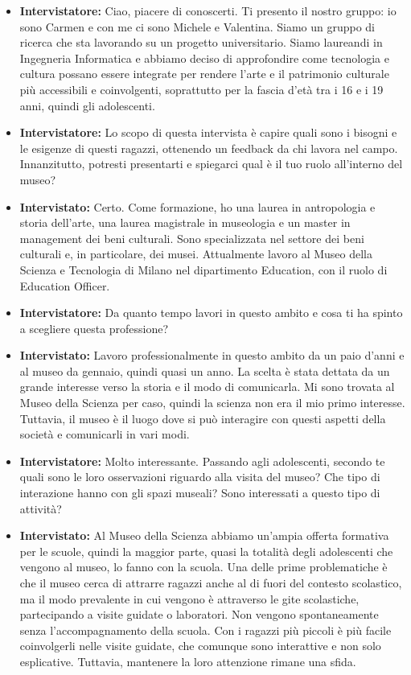 \documentclass{article}
\begin{document}
\begin{itemize}
    \item \textbf{Intervistatore:} Ciao, piacere di conoscerti. Ti presento il nostro gruppo: io sono Carmen e con me ci sono Michele e Valentina. Siamo un gruppo di ricerca che sta lavorando su un progetto universitario. Siamo laureandi in Ingegneria Informatica e abbiamo deciso di approfondire come tecnologia e cultura possano essere integrate per rendere l'arte e il patrimonio culturale più accessibili e coinvolgenti, soprattutto per la fascia d'età tra i 16 e i 19 anni, quindi gli adolescenti.
    
    \item \textbf{Intervistatore:} Lo scopo di questa intervista è capire quali sono i bisogni e le esigenze di questi ragazzi, ottenendo un feedback da chi lavora nel campo. Innanzitutto, potresti presentarti e spiegarci qual è il tuo ruolo all'interno del museo?
    
    \item \textbf{Intervistato:} Certo. Come formazione, ho una laurea in antropologia e storia dell'arte, una laurea magistrale in museologia e un master in management dei beni culturali. Sono specializzata nel settore dei beni culturali e, in particolare, dei musei. Attualmente lavoro al Museo della Scienza e Tecnologia di Milano nel dipartimento Education, con il ruolo di Education Officer.
    
    \item \textbf{Intervistatore:} Da quanto tempo lavori in questo ambito e cosa ti ha spinto a scegliere questa professione?
    
    \item \textbf{Intervistato:} Lavoro professionalmente in questo ambito da un paio d'anni e al museo da gennaio, quindi quasi un anno. La scelta è stata dettata da un grande interesse verso la storia e il modo di comunicarla. Mi sono trovata al Museo della Scienza per caso, quindi la scienza non era il mio primo interesse. Tuttavia, il museo è il luogo dove si può interagire con questi aspetti della società e comunicarli in vari modi.
    
    \item \textbf{Intervistatore:} Molto interessante. Passando agli adolescenti, secondo te quali sono le loro osservazioni riguardo alla visita del museo? Che tipo di interazione hanno con gli spazi museali? Sono interessati a questo tipo di attività?
    
    \item \textbf{Intervistato:} Al Museo della Scienza abbiamo un'ampia offerta formativa per le scuole, quindi la maggior parte, quasi la totalità degli adolescenti che vengono al museo, lo fanno con la scuola. Una delle prime problematiche è che il museo cerca di attrarre ragazzi anche al di fuori del contesto scolastico, ma il modo prevalente in cui vengono è attraverso le gite scolastiche, partecipando a visite guidate o laboratori. Non vengono spontaneamente senza l'accompagnamento della scuola. Con i ragazzi più piccoli è più facile coinvolgerli nelle visite guidate, che comunque sono interattive e non solo esplicative. Tuttavia, mantenere la loro attenzione rimane una sfida.
    

\end{itemize}
\end{document}
